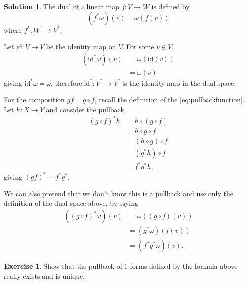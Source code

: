 \documentclass[11pt, a4paper]{article}
\theoremstyle{definition}
\newtheorem{ex}{Exercise}[part]
\newtheorem{sol}{Solution}[part]
\begin{document}
\begin{sol}

The dual of a linear map $f: V \to W$ is defined by
\[
    (f^*\omega)(v) = \omega(f(v))
\]
where $f^*: W^* \to V^*$.

Let $\text{id}: V \to V$ be the identity map on $V$. For some $v \in V$,
\begin{align*}
    (\text{id}^*\omega)(v) &= \omega(\text{id}(v)) \\
                           &= \omega(v)
\end{align*}
giving $\text{id}^*\omega = \omega$, therefore $\text{id}^*: V^* \to V^*$ is the identity map in the dual space.

For the composition $gf = g \circ f$, recall the definition of the \ref{eq:pullbackfunction}. %
Let $h: X \to Y$ and consider the pullback
\begin{align*}
    {(g \circ f)}^* h &= h \circ (g \circ f) \\
                      &= h \circ g \circ f \\
                      &= (h \circ g) \circ f \\
                      &= (g^* h) \circ f \\
                      &= f^* g^* h,
\end{align*}
giving ${(gf)}^* = f^* g^*$.

We can also pretend that we don't know this is a pullback and use only the definition of the dual space above, by saying
\begin{align*}
    ({(g \circ f)}^*\omega)(v) &= \omega((g \circ f)(v)) \\
        &= (g^* \omega)(f(v)) \\
        &= (f^* g^* \omega)(v).
\end{align*}

\end{sol}

\begin{ex}

Show that the pullback of 1-forms defined by the formula above really exists and is unique.

\end{ex}
\end{document}
